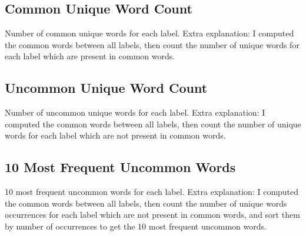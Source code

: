 \subsection{Common Unique Word Count}
Number of common unique words for each label.  
Extra explanation: I computed the common words between all labels, then count the number of unique words for each label which are present in common words.
\begin{adjustbox}{max width=\textwidth}
\end{adjustbox}

\subsection{Uncommon Unique Word Count}
Number of uncommon unique words for each label.  
Extra explanation: I computed the common words between all labels, then count the number of unique words for each label which are not present in common words.
\begin{adjustbox}{max width=\textwidth}
\end{adjustbox}

\subsection{10 Most Frequent Uncommon Words}
10 most frequent uncommon words for each label.  
Extra explanation: I computed the common words between all labels, then count the number of unique words occurrences for each label which are not present in common words, and sort them by number of occurrences to get the 10 most frequent uncommon words.
\begin{adjustbox}{max width=\textwidth}
\end{adjustbox}

